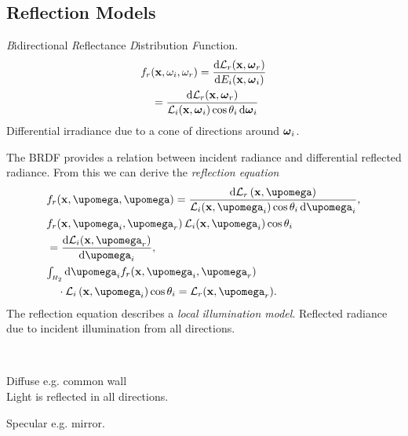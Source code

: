 \begin{compactdesc}
\section{Reflection Models}
\item[\lp{BRDF}] \emph{B}idirectional \emph{R}eflectance \emph{D}istribution \emph{F}unction.
	\begin{align*}
		&f_r(\vtr{x},\omega_i,\omega_r)=\dv{\mathcal{L}_r(\vtr{x},\vtr{\omega}_r)}{E_i(\vtr{x},\vtr{\omega}_i)}\\
		&\quad=\frac{\dd{\mathcal{L}_r(\vtr{x},\vtr{\omega}_r)}}{\mathcal{L}_i(\vtr{x},\vtr{\omega}_i)\cos\theta_i\dd{\vtr{\omega}}_i}
	\end{align*}
	Differential irradiance due to a cone of directions around $\bm{\mathrm{\omega}}_i$.
\item[\lp{Reflection Equation}] The BRDF provides a relation between incident radiance and differential reflected radiance. From this we can derive the \emph{reflection equation}
	\begin{align}
		&f_r\!\left( \vtr{x},\vtr{\upomega},\vtr{\upomega} \right)=\frac{\dd{\mathcal{L}_r\left( \vtr{x},\vtr{\upomega} \right)}}{\mathcal{L}_i\!\left( \vtr{x},\vtr{\upomega}_i \right)\cos \theta_i \dd{\vtr{\upomega}_i}},\nonumber\\
		&f_r\!\left( \vtr{x}, \vtr{\upomega}_i,\vtr{\upomega}_r \right)\mathcal{L}_i\!\left( \vtr{x},\vtr{\upomega}_i \right)\cos \theta_i\nonumber\\
		&= \dv{\mathcal{L}_i\!\left( \vtr{x},\vtr{\upomega}_r \right)}{\vtr{\upomega}_i},\nonumber\\
		&{\scriptstyle\int_{H_2}^{}}\dd{\vtr{\upomega}_i} f_r\!\left( \vtr{x},\vtr{\upomega}_i,\vtr{\upomega}_r \right)\nonumber\\
		&\quad\cdot \mathcal{L}_i\left( \vtr{x},\vtr{\upomega}_i \right)\cos\theta_i =\mathcal{L}_r(\vtr{x},\vtr{\upomega}_r).
	\end{align}
	The reflection equation describes a \emph{local illumination model}. Reflected radiance due to incident illumination from all directions.
\item[\lp{simpler reflections}] \hfill\\
	\begin{enumerate*}[label=\protect\circled{\arabic*},itemjoin=]
		\item Diffuse e.g. common wall\\
			Light is reflected in all directions.\\
		\item Specular e.g. mirror.\\

\end{enumerate*}
\end{compactdesc}
